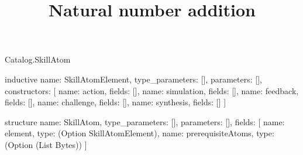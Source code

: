 \begin{lexlean}{Catalog.SkillAtom}
\title{Natural number addition}
\begin{semanticmodule}
inductive{
  name: SkillAtomElement,
  type_parameters: [],
  parameters: [],
  constructors: [
    {name: action, fields: []},
    {name: simulation, fields: []},
    {name: feedback, fields: []},
    {name: challenge, fields: []},
    {name: synthesis, fields: []}
  ]
}

structure{
  name: SkillAtom,
  type_parameters: [],
  parameters: [],
  fields: [
    {name: element, type: (Option SkillAtomElement)},
    {name: prerequisiteAtoms, type: (Option (List Bytes))}
  ]
}
\end{semanticmodule}
\end{lexlean}

